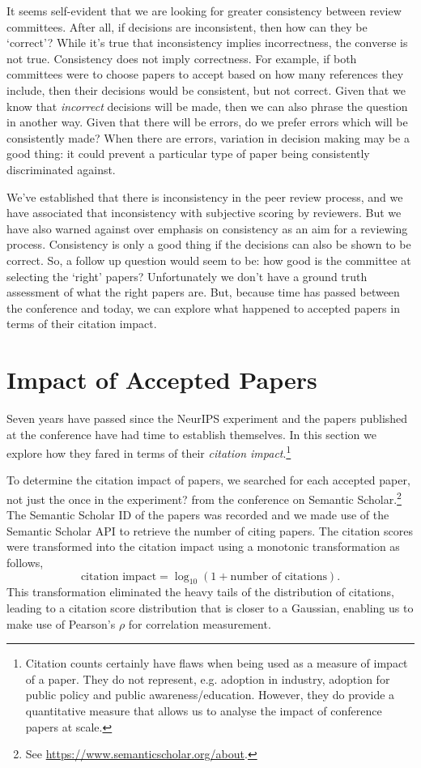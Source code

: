 \documentclass[twoside]{article}
\newcommand\cc[1]{{\color{red}#1}}
\begin{document}
It seems self-evident that we are looking for greater consistency between review
committees. After all, if decisions are inconsistent, then how can
they be `correct'? While it's true that inconsistency implies
incorrectness, the converse is not true. Consistency does not imply
correctness. For example, if both committees were to choose papers to
accept based on how many references they include, then their decisions
would be consistent, but not correct. Given that we know that
\emph{incorrect} decisions will be made, then we can also phrase the
question in another way. Given that there will be errors, do we prefer
errors which will be consistently made? When there are errors,
variation in decision making may be a good thing: it could prevent a
particular type of paper being consistently discriminated against.

We've established that there is inconsistency in the peer review
process, and we have associated that inconsistency with subjective
scoring by reviewers. But we have also warned against over emphasis on
consistency as an aim for a reviewing process. Consistency is only a
good thing if the decisions can also be shown to be correct. So, a
follow up question would seem to be: how good is the committee at
selecting the `right' papers? Unfortunately we don't have a ground
truth assessment of what the right papers are. But, because time has
passed between the conference and today, we can explore what happened
to accepted papers in terms of their citation impact.

\section{Impact of Accepted Papers}

Seven years have passed since the NeurIPS experiment and the papers
published at the conference have had time to establish themselves. In
this section we explore how they fared in terms of their
\emph{citation impact}.\footnote{Citation counts certainly have flaws
  when being used as a measure of impact of a paper. They do not
  represent, e.g. adoption in industry, adoption for public policy and
  public awareness/education. However, they do provide a quantitative
  measure that allows us to analyse the impact of conference papers at
  scale.}

To determine the citation impact of papers, we searched for each
accepted paper, \cc{not just the once in the experiment?} from the conference on Semantic Scholar.\footnote{See
  \href{https://www.semanticscholar.org/about}{https://www.semanticscholar.org/about}.}
The Semantic Scholar ID of the papers was recorded and we made use of
the Semantic Scholar API to retrieve the number of citing papers. The
citation scores were transformed into the citation impact using a
monotonic transformation as follows,
$$
\text{citation impact} = \log_{10} (1 + \text{number of citations}).
$$
This transformation eliminated the heavy tails of the distribution
of citations, leading to a citation score distribution that is closer
to a Gaussian, enabling us to make use of Pearson's $\rho$ for
correlation measurement.
\end{document}
